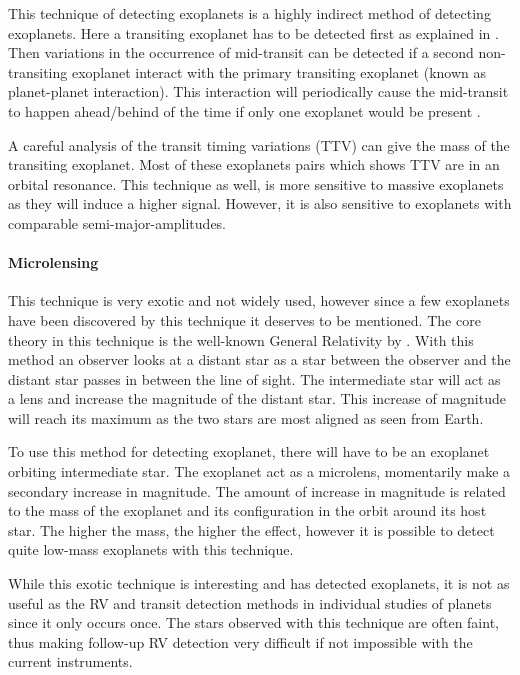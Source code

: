 This technique of detecting exoplanets is a highly indirect method of detecting exoplanets. Here a
transiting exoplanet has to be detected first as explained in . Then
variations in the occurrence of mid-transit can be detected if a second non-transiting exoplanet
interact with the primary transiting exoplanet (known as planet-planet interaction). This
interaction will periodically cause the mid-transit to happen ahead/behind of the time if only one
exoplanet would be present \citep{Agol2005,Holman2005}.

A careful analysis of the transit timing variations (TTV) can give the mass of the transiting
exoplanet. Most of these exoplanets pairs which shows TTV are in an orbital resonance. This
technique as well, is more sensitive to massive exoplanets as they will induce a higher signal.
However, it is also sensitive to exoplanets with comparable semi-major-amplitudes.


\paragraph{Microlensing}

This technique is very exotic and not widely used, however since a few exoplanets have been
discovered by this technique it deserves to be mentioned. The core theory in this technique is the
well-known General Relativity by \citet{Einstein1916}. With this method an observer looks at a
distant star as a star between the observer and the distant star passes in between the line of
sight. The intermediate star will act as a lens and increase the magnitude of the distant star. This
increase of magnitude will reach its maximum as the two stars are most aligned as seen from Earth.

To use this method for detecting exoplanet, there will have to be an exoplanet orbiting intermediate
star. The exoplanet act as a microlens, momentarily make a secondary increase in magnitude. The
amount of increase in magnitude is related to the mass of the exoplanet and its configuration in the
orbit around its host star. The higher the mass, the higher the effect, however it is possible to
detect quite low-mass exoplanets with this technique.

While this exotic technique is interesting and has detected exoplanets, it is not as useful as the
RV and transit detection methods in individual studies of planets since it only occurs once. The
stars observed with this technique are often faint, thus making follow-up RV detection very
difficult if not impossible with the current instruments.



